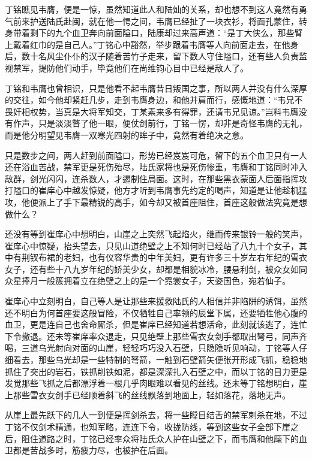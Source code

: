丁铭瞧见韦膺，便是一惊，虽然知道此人和陆灿的关系，却也想不到这人竟然有勇气前来护送陆氏赴闽，就在他一愕之间，韦膺已经扯了一块衣衫，将面孔蒙住，转身带着剩下的九个血卫奔向前面隘口，陆康却过来高声道：“是丁大侠么，那些臂上戴着红巾的是自己人。”丁铭心中豁然，举步跟着韦膺等人向前面走去，在他身后，数十名风尘仆仆的汉子随着苦竹子走来，留下数人守住隘口，还有些人负责监视禁军，提防他们动手，毕竟他们在尚维钧心目中已经是敌人了。

丁铭和韦膺也曾相识，只是他看不起韦膺昔日叛国之事，所以两人并没有什么深厚的交往，如今他却紧赶几步，走到韦膺身边，和他并肩而行，感慨地道：“韦兄不畏奸相权势，当真是大将军知交，丁某素来多有得罪，还请韦兄见谅。”岂料韦膺没有作声，只是淡淡瞥了他一眼，便仗剑前行，丁铭一愣，却非是奇怪韦膺的无礼，而是他分明望见韦膺一双寒光四射的眸子中，竟然有着绝决之意。

只是数步之间，两人赶到前面隘口，形势已经岌岌可危，留下的五个血卫只有一人还在浴血苦战，禁军更是死伤殆尽，陆氏家将也是死伤惨重，韦膺和丁铭同时冲入敌群，剑光闪闪，连杀数人，才遏制住局面。这时，在那些黑衣蒙面人后面指挥攻打隘口的崔庠心中越发惊疑，他方才听到韦膺事先约定的喝声，知道是让他趁机猛攻，他便派上了手下最精锐的高手，如今却又被首座阻住，首座这般做法究竟是想做什么？

还没有等到崔庠心中想明白，山崖之上突然飞起焰火，继而传来银铃一般的笑声，崔庠心中惊疑，抬头望去，只见山道绝壁之上不知何时已经站了八九十个女子，其中有荆钗布裙的老妇，也有仪容华贵的中年美妇，更有许多三十岁左右年纪的雪衣女子，还有些十八九岁年纪的娇美少女，却都是相貌冰冷，腰悬利剑，被众女如同众星捧月一般簇拥着立在绝壁之上的是一个霓裳女子，天姿国色，宛若仙子。

崔庠心中立刻明白，自己等人是让那些来援救陆氏的人相信并非陷阱的诱饵，虽然还不明白为何首座要这般冒险，不仅牺牲自己率领的辰堂下属，还要牺牲他心腹的血卫，更是连自己也舍命厮杀，但是崔庠已经知道若想活命，此刻就该逃了，连忙下令撤退。还未等崔庠率众退走，只见绝壁上那些雪衣女剑手都取出弩弓，同声齐喝，三道乌光射向对面的山崖，轻轻巧巧没入石壁，只隐隐听见响动，丁铭等人仔细看去，那些乌光却是一些特制的弩箭，一触到石壁箭矢便张开形成飞抓，稳稳地抓住了突出的岩石，铁抓削铁如泥，都是深深扎入石壁之中，而以丁铭的目力更是发觉那些飞抓之后都漂浮着一根几乎肉眼难以看见的丝线。还未等丁铭想明白，崖上那些雪衣女剑手已经顺着斜飞的丝线飘落到地面上，轻如落花，落地无声。

从崖上最先跃下的几人一到便是挥剑杀去，将一些瞠目结舌的禁军刺杀在地，不过丁铭不仅剑术精通，也知军略，连连下令，收拢防线，等到这些女子全部下崖之后，阻住道路之时，丁铭已经率众将陆氏众人护在山壁之下，而韦膺和他麾下的血卫都是苦战多时，筋疲力尽，也被护在后面。

